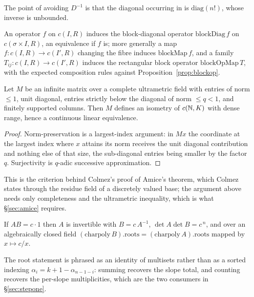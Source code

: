 The point of avoiding $D^{-1}$ is that the diagonal occurring in \cite[Proposition 2.17]{LWX} is
$\mathrm{diag}(n!)$, whose inverse is unbounded.

\begin{definition}
  \label{def:blockmaps}
  \leanok
  An operator $f$ on $c(I,R)$ induces the block-diagonal operator $\mathrm{blockDiag}\,f$ on
  $c(\sigma\times I, R)$, an equivalence if $f$ is; more generally a map
  $f : c(I,R) \to c(I',R)$ changing the fibre induces $\mathrm{blockMap}\,f$, and a family
  $T_{ij} : c(I,R)\to c(I',R)$ induces the rectangular block operator
  $\mathrm{blockOpMap}\,T$, with the expected composition rules against
  Proposition~\ref{prop:blockop}.
\end{definition}

\begin{theorem}
  \label{thm:unitriangular}
  \leanok
  Let $M$ be an infinite matrix over a complete ultrametric field with entries of norm
  $\leq 1$, unit diagonal, entries strictly below the diagonal of norm $\leq q < 1$, and
  finitely supported columns.  Then $M$ defines an isometry of $c(\mathbb{N},K)$ with dense range, hence
  a continuous linear equivalence.
\end{theorem}

\begin{proof}
  \leanok
  Norm-preservation is a largest-index argument: in $Mx$ the coordinate at the largest index
  where $x$ attains its norm receives the unit diagonal contribution and nothing else of that
  size, the sub-diagonal entries being smaller by the factor $q$.  Surjectivity is $q$-adic
  successive approximation.
\end{proof}

This is the criterion behind Colmez's proof of Amice's theorem, which Colmez states through the
residue field of a discretely valued base; the argument above needs only completeness and the
ultrametric inequality, which is what \S\ref{sec:amice} requires.

\begin{lemma}
  \label{lem:charpoly-pairing}
  \leanok
  If $AB = c\cdot 1$ then $A$ is invertible with $B = c\,A^{-1}$, $\det A\det B = c^{\,n}$, and
  over an algebraically closed field
  $(\mathrm{charpoly}\,B).\mathrm{roots} = (\mathrm{charpoly}\,A).\mathrm{roots}$ mapped by
  $x \mapsto c/x$.
\end{lemma}

The root statement is phrased as an identity of multisets rather than as a sorted indexing
$\alpha_i = k+1-\alpha_{n-1-i}$: summing recovers the slope total, and counting recovers the
per-slope multiplicities, which are the two consumers in \S\ref{sec:stepone}.
